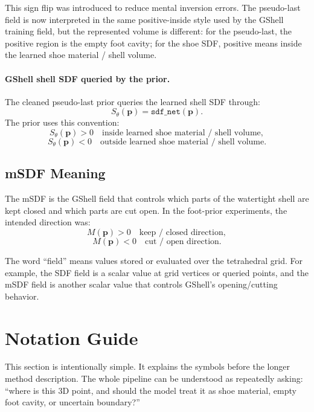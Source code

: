 \documentclass[11pt]{article}
\newcommand{\pt}{\mathbf{p}}
\begin{document}
This sign flip was introduced to reduce mental inversion errors.  The
pseudo-last field is now interpreted in the same positive-inside style used by
the GShell training field, but the represented volume is different: for the
pseudo-last, the positive region is the empty foot cavity; for the shoe SDF,
positive means inside the learned shoe material / shell volume.

\paragraph{GShell shell SDF queried by the prior.}
The cleaned pseudo-last prior queries the learned shell SDF through:
\[
S_\theta(\pt) = \texttt{sdf\_net}(\pt).
\]
The prior uses this convention:
\[
S_\theta(\pt) > 0 \quad \text{inside learned shoe material / shell volume},
\]
\[
S_\theta(\pt) < 0 \quad \text{outside learned shoe material / shell volume}.
\]

\subsection{mSDF Meaning}

The mSDF is the GShell field that controls which parts of the watertight shell
are kept closed and which parts are cut open.  In the foot-prior experiments,
the intended direction was:
\[
M(\pt) > 0 \quad \text{keep / closed direction},
\]
\[
M(\pt) < 0 \quad \text{cut / open direction}.
\]

The word ``field'' means values stored or evaluated over the tetrahedral grid.
For example, the SDF field is a scalar value at grid vertices or queried
points, and the mSDF field is another scalar value that controls GShell's
opening/cutting behavior.

\section{Notation Guide}

This section is intentionally simple.  It explains the symbols before the
longer method description.  The whole pipeline can be understood as repeatedly
asking: ``where is this 3D point, and should the model treat it as shoe
material, empty foot cavity, or uncertain boundary?''
\end{document}
